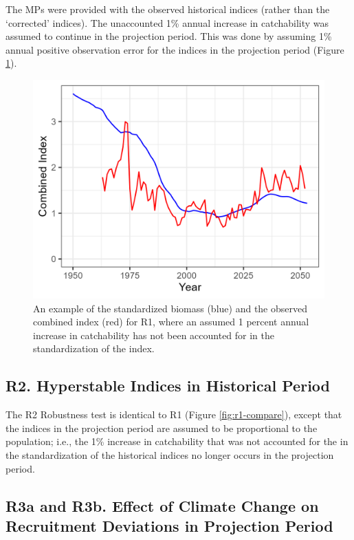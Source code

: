 \documentclass[
]{article}
\begin{document}
The MPs were provided with the observed historical indices (rather than the `corrected' indices). The unaccounted 1\% annual increase in catchability was assumed to continue in the projection period. This was done by assuming 1\% annual positive observation error for the indices in the projection period (Figure \ref{fig:r1-index}).

\begin{figure}
\includegraphics[width=16.67in]{../../img/R1_Increasing_q/Index} \caption{An example of the standardized biomass (blue) and the observed combined index (red) for R1, where an assumed 1 percent annual increase in catchability has not been accounted for in the standardization of the index.}\label{fig:r1-index}
\end{figure}

\hypertarget{r2.-hyperstable-indices-in-historical-period}{%
\subsection{R2. Hyperstable Indices in Historical Period}\label{r2.-hyperstable-indices-in-historical-period}}

The R2 Robustness test is identical to R1 (Figure \ref{fig:r1-compare}), except that the indices in the projection period are assumed to be proportional to the population; i.e., the 1\% increase in catchability that was not accounted for the in the standardization of the historical indices no longer occurs in the projection period.

\hypertarget{r3a-and-r3b.-effect-of-climate-change-on-recruitment-deviations-in-projection-period}{%
\subsection{R3a and R3b. Effect of Climate Change on Recruitment Deviations in Projection Period}\label{r3a-and-r3b.-effect-of-climate-change-on-recruitment-deviations-in-projection-period}}
\end{document}

